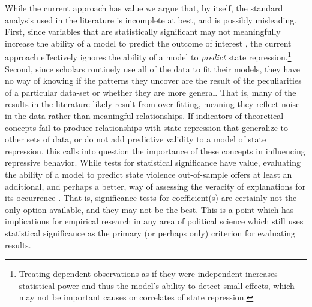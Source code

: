 \documentclass[11pt]{article}
\begin{document}
While the current approach has value we argue that, by itself, the standard analysis used in the literature is incomplete at best, and is possibly misleading. First, since variables that are statistically significant may not meaningfully increase the ability of a model to predict the outcome of interest \citep{Wardetal2010}, the current approach effectively ignores the ability of a model to {\em predict} state repression.\footnote{Treating dependent observations as if they were independent increases statistical power and thus the model's ability to detect small effects, which may not be important causes or correlates of state repression.} Second, since scholars routinely use all of the data to fit their models, they have no way of knowing if the patterns they uncover are the result of the peculiarities of a particular data-set or whether they are more general. That is, many of the results in the literature likely result from over-fitting, meaning they reflect noise in the data rather than meaningful relationships. If indicators of theoretical concepts fail to produce relationships with state repression that generalize to other sets of data, or do not add predictive validity to a model of state repression, this calls into question the importance of these concepts in influencing repressive behavior. While tests for statistical significance have value, evaluating the ability of a model to predict state violence out-of-sample offers at least an additional, and perhaps a better, way of assessing the veracity of explanations for its occurrence \citep[See, e.g.][]{BeckKingZeng2000}. That is, significance tests for coefficient(s) are certainly not the only option available, and they may not be the best. This is a point which has implications for empirical research in any area of political science which still uses statistical significance as the primary (or perhaps only) criterion for evaluating results.
\end{document}
